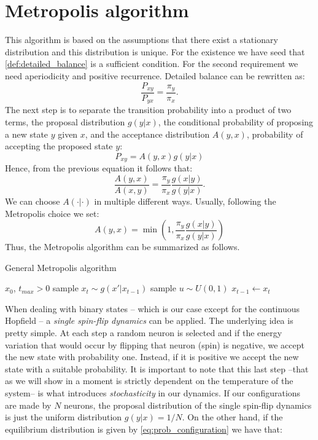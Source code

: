\documentclass[\rootdir/main.tex]{subfiles}
\begin{document}
\section{Metropolis algorithm}\label{sec:metr-lg}
This algorithm is based on the assumptions that there exist a stationary distribution and this distribution is unique. For the existence we have seed that \cref{def:detailed_balance} is a sufficient condition. For the second requirement we need aperiodicity and positive recurrence. Detailed balance can be rewritten as:
\begin{equation*}
    \frac{P_{xy}}{P_{yx}} = \frac{\pi_y}{\pi_{x}}.
\end{equation*}
The next step is to separate the transition probability into a product of two terms, the proposal distribution $g\left(y | x \right)$, \ie the conditional probability of proposing a new state $y$ given $x$, and the acceptance distribution $A(y,x)$, \ie probability of accepting the proposed state $y$:
\begin{equation*}
    P_{xy} = A(y, x)g(y | x)
\end{equation*}
Hence, from the previous equation it follows that:
\begin{equation*}
    \frac{A(y, x)}{A(x, y)} = \frac{\pi_y}{\pi_x} \frac{g(x | y)}{g(y | x)}.
\end{equation*}
We can choose $A(\cdot | \cdot)$ in multiple different ways. Usually, following the Metropolis choice we set:
\begin{equation}
    A(y , x) = \operatorname{min} \left(1,  \frac{\pi_y}{\pi_x} \frac{g(x | y)}{g(y | x)}\right)
\end{equation}
Thus, the Metropolis algorithm can be summarized as follows.
\begin{algorithm}
    \caption{General Metropolis algorithm}
    \label{alg:1}
    \begin{algorithmic}[1]
    \Require $x_0$, $t_{max} > 0$
        \State sample $x_{t} \sim g(x' | x_{t-1}) $ 
        \State sample $u \sim U(0, 1)$
            \State $x_{t-1} \gets x_{t} $
        \EndIf
        \EndFor
    \end{algorithmic}
\end{algorithm}
When dealing with binary states -- which is our case except for the continuous Hopfield -- a \emph{single spin-flip dynamics} can be applied. The underlying idea is pretty simple. At each step a random neuron is selected and if the energy variation that would occur by flipping that neuron (spin) is negative, we accept the new state with probability one. Instead, if it is positive we accept the new state with a suitable probability. It is important to note that this last step --that as we will show in a moment is strictly dependent on the temperature of the system-- is what introduces \emph{stochasticity} in our dynamics. If our configurations are made by $N$ neurons, the proposal distribution of the single spin-flip dynamics is just the uniform distribution $g(y | x) = 1/N$. On the other hand, if the equilibrium distribution is given by \cref{eq:prob_configuration} we have that:
\end{document}
